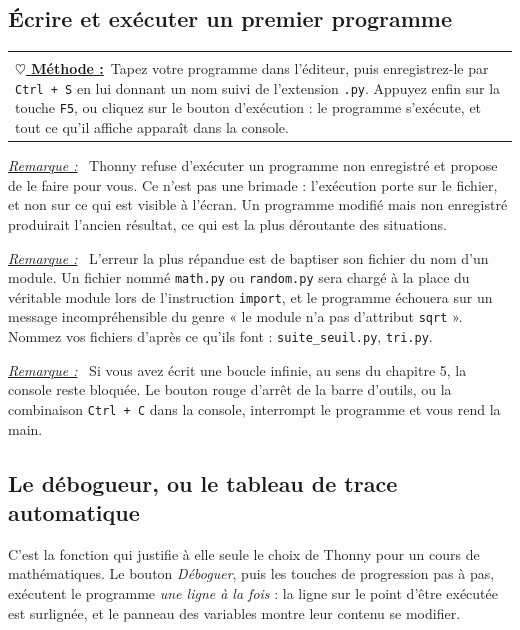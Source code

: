 \documentclass[a4paper,11pt,openany]{book}
\makeatletter
\newcommand{\code}[1]{\texttt{\textcolor{codebleu}{#1}}}
\newenvironment{cadre}%
 {\par\vspace{2mm}\noindent\begin{tabular}{|@{\hspace{4mm}}p{0.93\textwidth}@{\hspace{4mm}}|}
  \hline \\[-2mm]}%
 {\\[2mm] \hline \end{tabular}\par\vspace{3mm}}
\newcommand{\methode}{\textbf{\underline{$\heartsuit$ Méthode :}}~}
\newenvironment{remarque}%
 {\par\vspace{1mm}\begin{list}{}{\leftmargin=1cm \rightmargin=0.5cm}\item[]%
  \textit{\underline{Remarque :}}~}%
 {\end{list}\vspace{1mm}}
\makeatother
\begin{document}
\subsection{Écrire et exécuter un premier programme}

\begin{cadre}
\methode Tapez votre programme dans l'éditeur, puis enregistrez-le par \code{Ctrl + S} en lui donnant un nom suivi de l'extension \code{.py}. Appuyez enfin sur la touche \code{F5}, ou cliquez sur le bouton d'exécution : le programme s'exécute, et tout ce qu'il affiche apparaît dans la console.
\end{cadre}

\begin{remarque}
Thonny refuse d'exécuter un programme non enregistré et propose de le faire pour vous. Ce n'est pas une brimade : l'exécution porte sur le fichier, et non sur ce qui est visible à l'écran. Un programme modifié mais non enregistré produirait l'ancien résultat, ce qui est la plus déroutante des situations.
\end{remarque}

\begin{remarque}
L'erreur la plus répandue est de baptiser son fichier du nom d'un module. Un fichier nommé \code{math.py} ou \code{random.py} sera chargé à la place du véritable module lors de l'instruction \code{import}, et le programme échouera sur un message incompréhensible du genre « le module n'a pas d'attribut \code{sqrt} ». Nommez vos fichiers d'après ce qu'ils font : \code{suite\_seuil.py}, \code{tri.py}.
\end{remarque}

\begin{remarque}
Si vous avez écrit une boucle infinie, au sens du chapitre 5, la console reste bloquée. Le bouton rouge d'arrêt de la barre d'outils, ou la combinaison \code{Ctrl + C} dans la console, interrompt le programme et vous rend la main.
\end{remarque}

\subsection{Le débogueur, ou le tableau de trace automatique}

C'est la fonction qui justifie à elle seule le choix de Thonny pour un cours de mathématiques. Le bouton \emph{Déboguer}, puis les touches de progression pas à pas, exécutent le programme \emph{une ligne à la fois} : la ligne sur le point d'être exécutée est surlignée, et le panneau des variables montre leur contenu se modifier.
\end{document}
